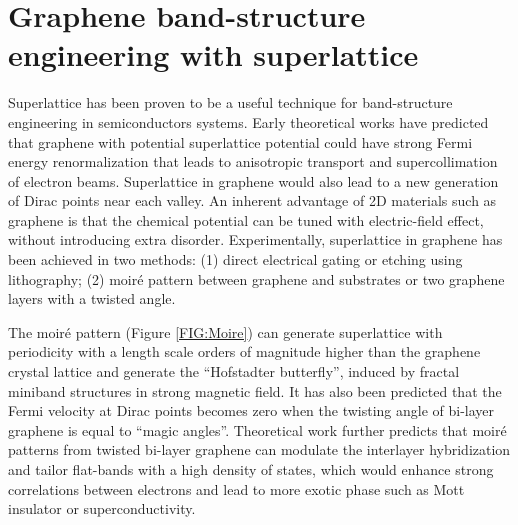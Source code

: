 \documentclass[pdflatex, sectionletters, 12pt, final, phd]{pittetd}    %
\begin{document}
\section{Graphene band-structure engineering with superlattice}

Superlattice has been proven to be a useful technique for band-structure engineering in semiconductors systems\cite{tsu2010superlattice}. Early theoretical works have predicted that graphene with potential superlattice potential could have strong Fermi energy renormalization that leads to anisotropic transport\cite{park2008anisotropic} and supercollimation of electron beams\cite{park2008electron}. Superlattice in graphene would also lead to a new generation of Dirac points near each valley\cite{park2008new}. An inherent advantage of 2D materials such as graphene is that the chemical potential can be tuned with electric-field effect, without introducing extra disorder\cite{cao2018correlated}. Experimentally, superlattice in graphene has been achieved in two methods: (1) direct electrical gating or etching using lithography\cite{dubey2013tunable, forsythe2018band, jessen2019lithographic}; (2) moir{\'e} pattern between graphene and substrates\cite{dean2013hofstadter, hunt2013massive, ponomarenko2013cloing} or two graphene layers with a twisted angle\cite{cao2016superlattice, cao2018correlated, cao2018unconventional, chen2018gate, yankowitz2018dynamic}. 

The moir{\'e} pattern (Figure \ref{FIG:Moire}) can generate superlattice with periodicity with a length scale orders of magnitude higher than the graphene crystal lattice and generate the ``Hofstadter butterfly'', induced by fractal miniband structures in strong magnetic field\cite{dean2013hofstadter, hunt2013massive, ponomarenko2013cloing}. It has also been predicted\cite{bistritzer2011moire} that the Fermi velocity at Dirac points becomes zero when the twisting angle of bi-layer graphene is equal to ``magic angles''. Theoretical work\cite{bistritzer2011moire, suarez2010flat, lopes2012continuum} further predicts that moir{\'e} patterns from twisted bi-layer graphene can modulate the interlayer hybridization and tailor flat-bands with a high density of states, which would enhance strong correlations between electrons and lead to more exotic phase such as Mott insulator\cite{cao2016superlattice, cao2018correlated, chen2018gate} or superconductivity\cite{cao2018unconventional}.
\end{document}
